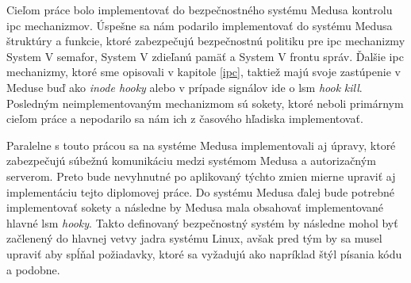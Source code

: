 Cieľom práce bolo implementovať do bezpečnostného systému Medusa kontrolu \acrshort{ipc} mechanizmov. Úspešne sa nám podarilo implementovať do systému Medusa štruktúry a funkcie, ktoré zabezpečujú bezpečnostnú politiku pre \acrshort{ipc} mechanizmy System V semafor, System V zdieľanú pamäť a System V frontu správ. Ďalšie \acrshort{ipc} mechanizmy, ktoré sme opisovali v kapitole \ref{ipc}, taktiež majú svoje zastúpenie v Meduse buď ako \textit{inode hooky} alebo v prípade signálov ide o \acrshort{lsm} \textit{hook} \textit{kill}. Posledným neimplementovaným mechanizmom sú sokety, ktoré neboli primárnym cieľom práce a nepodarilo sa nám ich z časového hľadiska implementovať. 

Paralelne s touto prácou sa na systéme Medusa implementovali aj úpravy, ktoré zabezpečujú súbežnú komunikáciu medzi systémom Medusa a autorizačným serverom. Preto bude nevyhnutné po aplikovaný týchto zmien mierne upraviť aj implementáciu tejto diplomovej práce. Do systému Medusa ďalej bude potrebné implementovať sokety a následne by Medusa mala obsahovať implementované hlavné \acrshort{lsm} \textit{hooky}. Takto definovaný bezpečnostný systém by následne mohol byť začlenený do hlavnej vetvy jadra systému Linux, avšak pred tým by sa musel upraviť aby spĺňal požiadavky, ktoré sa vyžadujú ako napríklad štýl písania kódu a podobne.